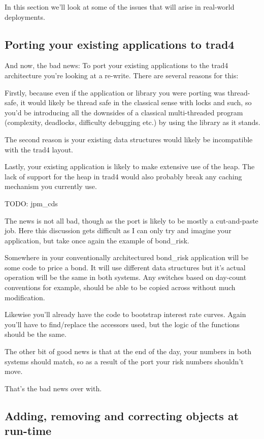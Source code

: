 \documentclass{report}
\begin{document}
In this section we'll look at some of the issues that will arise in real-world deployments.

\subsection{Porting your existing applications to trad4}

And now, the bad news: To port your existing applications to the trad4 architecture you're looking at a re-write. There are several reasons for this:

Firstly, because even if the application or library you were porting was thread-safe, it would likely be thread safe in the classical sense with locks and such, so you'd be introducing all the downsides of a classical multi-threaded program (complexity, deadlocks, difficulty debugging etc.) by using the library as it stands.

The second reason is your existing data structures would likely be incompatible with the trad4 
layout.

Lastly, your existing application is likely to make extensive use of the heap. The lack of support for the heap in trad4 would also probably break any caching mechanism you currently use.

TODO: jpm_cds

The news is not all bad, though as the port is likely to be mostly a cut-and-paste job. Here this discussion gets difficult as I can only try and imagine your application, but take once again the example of bond_risk.

Somewhere in your conventionally architectured bond_risk application will be some code to price a bond. It will use different data structures but it's actual operation will be the same in both systems. Any 
switches based on day-count conventions for example, should be able to be copied across without much modification.

Likewise you'll already have the code to bootstrap interest rate curves. Again you'll have to find/replace the accessors used, but the logic of the functions should be the same.

The other bit of good news is that at the end of the day, your numbers in both systems should match, so as a result of the port your risk numbers shouldn't move.

That's the bad news over with.

\subsection{Adding, removing and correcting objects at run-time}
\end{document}
